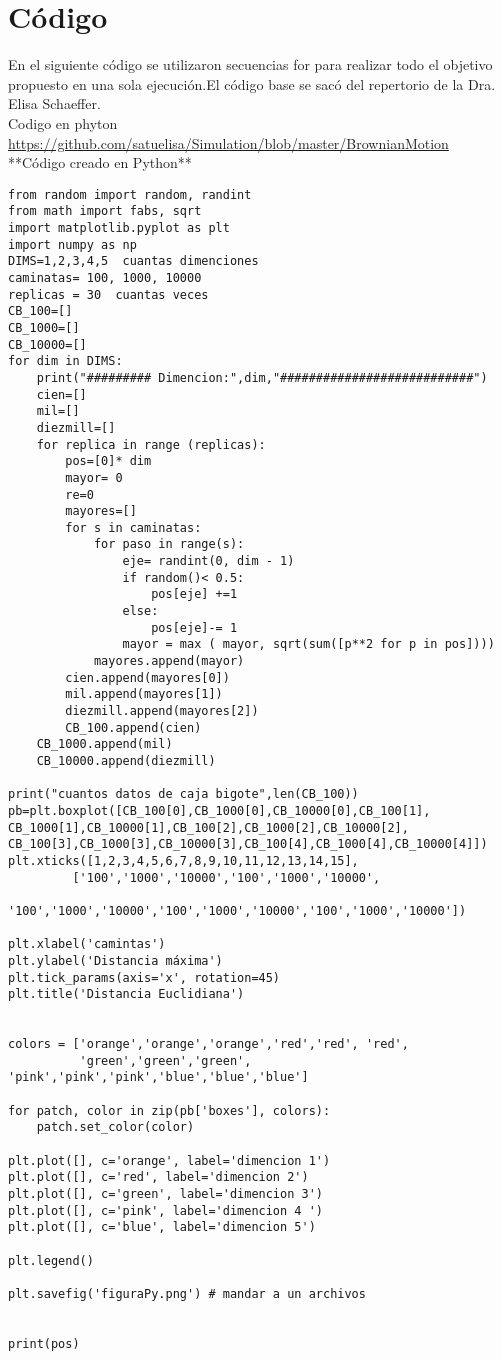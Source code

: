 \documentclass{article}
\begin{document}
\section{C\'{o}digo}
En el siguiente c\'{o}digo se utilizaron secuencias for para realizar todo el objetivo propuesto en una sola ejecución.El c\'{o}digo base se sac\'{o} del repertorio de la Dra. Elisa Schaeffer.
\\ Codigo en phyton 
\\\url{https://github.com/satuelisa/Simulation/blob/master/BrownianMotion}\\
**Código creado en Python**\
\begin{verbatim}
from random import random, randint
from math import fabs, sqrt
import matplotlib.pyplot as plt
import numpy as np 
DIMS=1,2,3,4,5  cuantas dimenciones
caminatas= 100, 1000, 10000
replicas = 30  cuantas veces
CB_100=[]
CB_1000=[]
CB_10000=[]
for dim in DIMS:
    print("######### Dimencion:",dim,"###########################")
    cien=[]
    mil=[]
    diezmill=[]
    for replica in range (replicas):
        pos=[0]* dim
        mayor= 0
        re=0
        mayores=[]
        for s in caminatas:
            for paso in range(s):
                eje= randint(0, dim - 1)
                if random()< 0.5:
                    pos[eje] +=1
                else:
                    pos[eje]-= 1
                mayor = max ( mayor, sqrt(sum([p**2 for p in pos])))
            mayores.append(mayor)
        cien.append(mayores[0])
        mil.append(mayores[1])
        diezmill.append(mayores[2])
        CB_100.append(cien)
    CB_1000.append(mil)
    CB_10000.append(diezmill)
    
print("cuantos datos de caja bigote",len(CB_100))
pb=plt.boxplot([CB_100[0],CB_1000[0],CB_10000[0],CB_100[1],
CB_1000[1],CB_10000[1],CB_100[2],CB_1000[2],CB_10000[2],
CB_100[3],CB_1000[3],CB_10000[3],CB_100[4],CB_1000[4],CB_10000[4]])
plt.xticks([1,2,3,4,5,6,7,8,9,10,11,12,13,14,15],
         ['100','1000','10000','100','1000','10000',
         '100','1000','10000','100','1000','10000','100','1000','10000'])

plt.xlabel('camintas')
plt.ylabel('Distancia máxima')
plt.tick_params(axis='x', rotation=45)
plt.title('Distancia Euclidiana')


colors = ['orange','orange','orange','red','red', 'red',   
          'green','green','green', 'pink','pink','pink','blue','blue','blue']

for patch, color in zip(pb['boxes'], colors): 
    patch.set_color(color)
    
plt.plot([], c='orange', label='dimencion 1')
plt.plot([], c='red', label='dimencion 2')
plt.plot([], c='green', label='dimencion 3')
plt.plot([], c='pink', label='dimencion 4 ')
plt.plot([], c='blue', label='dimencion 5')

plt.legend()
    
plt.savefig('figuraPy.png') # mandar a un archivos

        
print(pos)

\end{verbatim}
\end{document}
